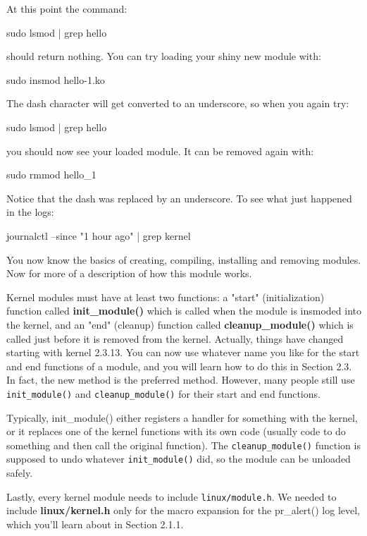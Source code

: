\documentclass[10pt, oneside]{book}
\begin{document}
At this point the command:
\begin{codebash}
sudo lsmod | grep hello
\end{codebash}

should return nothing.
You can try loading your shiny new module with:
\begin{codebash}
sudo insmod hello-1.ko
\end{codebash}

The dash character will get converted to an underscore, so when you again try:
\begin{codebash}
sudo lsmod | grep hello
\end{codebash}

you should now see your loaded module. It can be removed again with:
\begin{codebash}
sudo rmmod hello_1
\end{codebash}

Notice that the dash was replaced by an underscore.
To see what just happened in the logs:
\begin{codebash}
journalctl --since "1 hour ago" | grep kernel
\end{codebash}

You now know the basics of creating, compiling, installing and removing modules.
Now for more of a description of how this module works.

Kernel modules must have at least two functions: a "start" (initialization) function called \textbf{init\_module()} which is called when the module is insmoded into the kernel, and an "end" (cleanup) function called \textbf{cleanup\_module()} which is called just before it is removed from the kernel.
Actually, things have changed starting with kernel 2.3.13.
You can now use whatever name you like for the start and end functions of a module, and you will learn how to do this in Section 2.3.
In fact, the new method is the preferred method.
However, many people still use \verb|init_module()| and \verb|cleanup_module()| for their start and end functions.

Typically, init\_module() either registers a handler for something with the kernel, or it replaces one of the kernel functions with its own code (usually code to do something and then call the original function).
The \verb|cleanup_module()| function is supposed to undo whatever \verb|init_module()| did, so the module can be unloaded safely.

Lastly, every kernel module needs to include \verb|linux/module.h|.
We needed to include \textbf{linux/kernel.h} only for the macro expansion for the pr\_alert() log level, which you'll learn about in Section 2.1.1.
\end{document}
